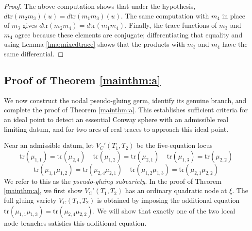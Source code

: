 \documentclass{article}
\theoremstyle{plain}
\theoremstyle{definition}
\theoremstyle{plain}
\theoremstyle{plain}
\theoremstyle{plain}
\theoremstyle{remark}
\theoremstyle{remark}
\theoremstyle{plain}
\theoremstyle{plain}
\newcounter{main}
\theoremstyle{plain}
\theoremstyle{plain}
\begin{document}
\begin{proof}
The above computation shows that under the hypothesis, $d\mathrm{tr}(m_2m_3)(u) = d\mathrm{tr}(m_1m_3)(u)$. The same computation with $m_4$ in place of $m_3$ gives $d\mathrm{tr}(m_2m_4) = d\mathrm{tr}(m_1m_4)$. Finally, the trace functions of $m_3$ and $m_4$ agree because these elements are conjugate; differentiating that equality and using Lemma \ref{lma:mixedtrace} shows that the products with $m_3$ and $m_4$ have the same differential.
\end{proof}

\subsection{Proof of Theorem \ref{mainthm:a}}

We now construct the nodal pseudo-gluing germ, identify its genuine branch, and complete the proof of Theorem \ref{mainthm:a}. This establishes sufficient criteria for an ideal point to detect an essential Conway sphere with an admissible real limiting datum, and for two arcs of real traces to approach this ideal point. 

\medskip

Near an admissible datum, let $V_C'(T_1, T_2)$ be the five-equation locus
\begin{equation}\label{eq:fiveeq1}
	\mathrm{tr}(\mu_{1, 1}) = \mathrm{tr}(\mu_{2, 4}) \ \ \ \ \ \mathrm{tr}(\mu_{1, 2}) = \mathrm{tr}(\mu_{2, 1}) \ \ \ \ \ \mathrm{tr}(\mu_{1, 3}) = \mathrm{tr}(\mu_{2, 2})
\end{equation}
\begin{equation}\label{eq:fiveeq2}
	\mathrm{tr}(\mu_{1, 1}\mu_{1, 2}) = \mathrm{tr}(\mu_{2, 4}\mu_{2, 1}) \ \ \ \ \ \mathrm{tr}(\mu_{1, 2}\mu_{1, 3}) = \mathrm{tr}(\mu_{2, 1}\mu_{2, 2}) 
\end{equation}
We refer to this as the \emph{pseudo-gluing subvariety}. In the proof of Theorem \ref{mainthm:a}, we first show $V_C'(T_1, T_2)$ has an ordinary quadratic node at $\xi$. The full gluing variety $V_C(T_1, T_2)$ is obtained by imposing the additional equation $\mathrm{tr}(\mu_{1, 1}\mu_{1, 3}) = \mathrm{tr}(\mu_{2, 4}\mu_{2, 2})$. We will show that exactly one of the two local node branches satisfies this additional equation.

\medskip
\end{document}
